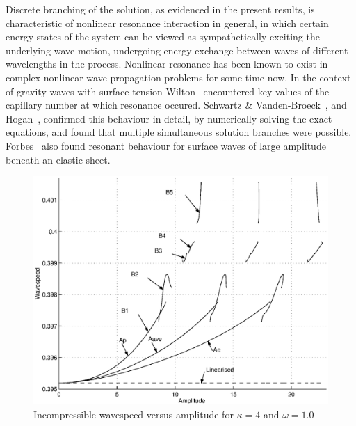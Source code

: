 Discrete branching of the solution, as evidenced in the present results, is characteristic of nonlinear resonance interaction in general, in which certain energy states of the system can be viewed as sympathetically exciting the underlying wave motion, undergoing energy exchange between waves of different wavelengths in the process. Nonlinear resonance has been known to exist in complex nonlinear wave propagation problems for some time now. In the context of gravity waves with surface tension Wilton~\cite{Wilton:OR} encountered key values of the capillary number at which resonance occured. Schwartz \& Vanden-Broeck~\cite{Schwartz:NSE}, and Hogan~\cite{Hogan:SES1,Hogan:SES2,Hogan:SES3}, confirmed this behaviour in detail, by numerically solving the exact equations, and found that multiple simultaneous solution branches were possible. Forbes~\cite{Forbes:SWL1,Forbes:SWL2} also found resonant behaviour for surface waves of large amplitude beneath an elastic sheet. 
\begin{figure}[tbp]
	\centering
		\includegraphics[scale=0.75]{IMAGES/CvsAk4w1.eps}
	\caption{Incompressible wavespeed versus amplitude for $\kappa=4$ and $\omega=1.0$}
	\label{fig:CvsAk4w1}
\end{figure}

